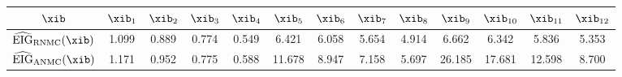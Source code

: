 \begin{tabular}{|c|c|c|c|c|c|c|c|c|c|c|c|c|}
\hline
$\xib$ & $\xib_{1}$ & $\xib_{2}$ & $\xib_{3}$ & $\xib_{4}$ & $\xib_{5}$ & $\xib_{6}$ & $\xib_{7}$ & $\xib_{8}$ & \cellcolor{cyellow}$\xib_{9}$ & $\xib_{10}$ & $\xib_{11}$ & $\xib_{12}$ \\
\hline
$\widehat{\mathrm{EIG}}_{\mathrm{RNMC}}(\xib)$ & 1.099 & 0.889 & 0.774 & 0.549 & 6.421 & 6.058 & 5.654 & 4.914 & \cellcolor{cyellow}6.662 & 6.342 & 5.836 & 5.353 \\
\hline
$\widehat{\mathrm{EIG}}_{\mathrm{ANMC}}(\xib)$ & 1.171 & 0.952 & 0.775 & 0.588 & 11.678 & 8.947 & 7.158 & 5.697 & \cellcolor{cyellow}26.185 & 17.681 & 12.598 & 8.700 \\
\hline
\end{tabular}